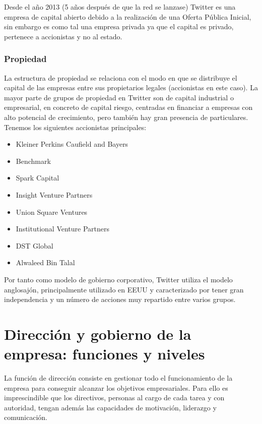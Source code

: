 Desde el año 2013 (5 años después de que la red se lanzase) Twitter es una empresa de capital abierto debido a la realización de una Oferta Pública Inicial, sin embargo es como tal una empresa privada ya que el capital es privado, pertenece a accionistas y no al estado.

\subsubsection{Propiedad}

La estructura de propiedad se relaciona con el modo en que se distribuye el capital de las empresas entre sus propietarios legales (accionistas en este caso). La mayor parte de grupos de propiedad en Twitter son de capital industrial o empresarial, en concreto de capital riesgo, centradas en financiar a empresas con alto potencial de crecimiento, pero también hay gran presencia de particulares. Tenemos los siguientes accionistas principales:

\begin{itemize}

\item Kleiner Perkins Caufield and Bayers
\item Benchmark
\item Spark Capital
\item Insight Venture Partners
\item Union Square Ventures
\item Institutional Venture Partners
\item DST Global
\item Alwaleed Bin Talal

\end{itemize}

Por tanto como modelo de gobierno corporativo, Twitter utiliza el modelo anglosajón, principalmente utilizado en EEUU y caracterizado por tener gran independencia y un número de acciones muy repartido entre varios grupos.

\section{Dirección y gobierno de la empresa: funciones y niveles}

La función de dirección consiste en gestionar todo el funcionamiento de la empresa para conseguir alcanzar los objetivos empresariales. Para ello es imprescindible que los directivos, personas al cargo de cada tarea y con autoridad, tengan además las capacidades de motivación, liderazgo y comunicación.

